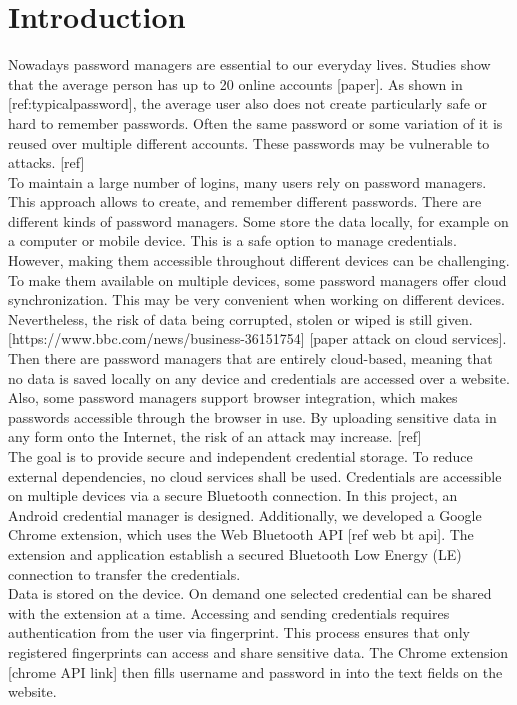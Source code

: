 \section*{Introduction}
\label{introduction}


Nowadays password managers are essential to our everyday lives. Studies show that the average person has up to 20 online accounts [paper]. As shown in [ref:typicalpassword], the average user also does not create particularly safe or hard to remember passwords. Often the same password or some variation of it is reused over multiple different accounts. These passwords may be vulnerable to attacks. [ref] \\

To maintain a large number of logins, many users rely on password managers. This approach allows to create, and remember different passwords. There are different kinds of password managers. Some store the data locally, for example on a computer or mobile device. This is a safe option to manage credentials. However, making them accessible throughout different devices can be challenging. To make them available on multiple devices, some password managers offer cloud synchronization. This may be very convenient when working on different devices. Nevertheless, the risk of data being corrupted, stolen or wiped is still given. [https://www.bbc.com/news/business-36151754] [paper attack on cloud services]. Then there are password managers that are entirely cloud-based, meaning that no data is saved locally on any device and credentials are accessed over a website. Also, some password managers support browser integration, which makes passwords accessible through the browser in use. By uploading sensitive data in any form onto the Internet, the risk of an attack may increase. [ref] \\

The goal is to provide secure and independent credential storage. To reduce external dependencies, no cloud services shall be used. Credentials are accessible on multiple devices via a secure Bluetooth connection. In this project, an Android credential manager is designed.  Additionally, we developed a Google Chrome extension, which uses the Web Bluetooth API [ref web bt api]. The extension and application establish a secured Bluetooth Low Energy (LE) connection to transfer the credentials. \\
Data is stored on the device. On demand one selected credential can be shared with the extension at a time. Accessing and sending credentials requires authentication from the user via fingerprint. This process ensures that only registered fingerprints can access and share sensitive data. 
The Chrome extension [chrome API link] then fills username and password in into the text fields on the website. \\ 


